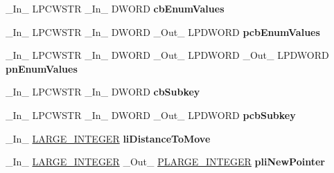 \begin{DoxyCompactItemize}
\item 
\mbox{\label{struct___p_r_i_n_t_p_r_o_v_i_d_o_r_aea21da724580dfa129e960c0cbc5632c}} 
\+\_\+\+In\+\_\+ L\+P\+C\+W\+S\+TR \+\_\+\+In\+\_\+ D\+W\+O\+RD {\bfseries cb\+Enum\+Values}
\item 
\mbox{\label{struct___p_r_i_n_t_p_r_o_v_i_d_o_r_a73f89ea2e4dcc33de848ef67937daf17}} 
\+\_\+\+In\+\_\+ L\+P\+C\+W\+S\+TR \+\_\+\+In\+\_\+ D\+W\+O\+RD \+\_\+\+Out\+\_\+ L\+P\+D\+W\+O\+RD {\bfseries pcb\+Enum\+Values}
\item 
\mbox{\label{struct___p_r_i_n_t_p_r_o_v_i_d_o_r_a4adc2c7a3c73f178168e808f08b8bb4c}} 
\+\_\+\+In\+\_\+ L\+P\+C\+W\+S\+TR \+\_\+\+In\+\_\+ D\+W\+O\+RD \+\_\+\+Out\+\_\+ L\+P\+D\+W\+O\+RD \+\_\+\+Out\+\_\+ L\+P\+D\+W\+O\+RD {\bfseries pn\+Enum\+Values}
\item 
\mbox{\label{struct___p_r_i_n_t_p_r_o_v_i_d_o_r_ade0d841aeb5d3515ac63d7675c7af05d}} 
\+\_\+\+In\+\_\+ L\+P\+C\+W\+S\+TR \+\_\+\+In\+\_\+ D\+W\+O\+RD {\bfseries cb\+Subkey}
\item 
\mbox{\label{struct___p_r_i_n_t_p_r_o_v_i_d_o_r_a700f0b0638ea20dbe1152b6c9e4d34d3}} 
\+\_\+\+In\+\_\+ L\+P\+C\+W\+S\+TR \+\_\+\+In\+\_\+ D\+W\+O\+RD \+\_\+\+Out\+\_\+ L\+P\+D\+W\+O\+RD {\bfseries pcb\+Subkey}
\item 
\mbox{\label{struct___p_r_i_n_t_p_r_o_v_i_d_o_r_aaea93b90778799a6266e90bc39ccbc5d}} 
\+\_\+\+In\+\_\+ \hyperlink{union___l_a_r_g_e___i_n_t_e_g_e_r}{L\+A\+R\+G\+E\+\_\+\+I\+N\+T\+E\+G\+ER} {\bfseries li\+Distance\+To\+Move}
\item 
\mbox{\label{struct___p_r_i_n_t_p_r_o_v_i_d_o_r_ae5a6b2ae52b4eff6c0e4f4e72e4a873f}} 
\+\_\+\+In\+\_\+ \hyperlink{union___l_a_r_g_e___i_n_t_e_g_e_r}{L\+A\+R\+G\+E\+\_\+\+I\+N\+T\+E\+G\+ER} \+\_\+\+Out\+\_\+ \hyperlink{union___l_a_r_g_e___i_n_t_e_g_e_r}{P\+L\+A\+R\+G\+E\+\_\+\+I\+N\+T\+E\+G\+ER} {\bfseries pli\+New\+Pointer}
\item 
\mbox{\label{struct___p_r_i_n_t_p_r_o_v_i_d_o_r_a31951eb07d5f8e9c2cdd3c61a62c0a67}} 

\end{DoxyCompactItemize}

